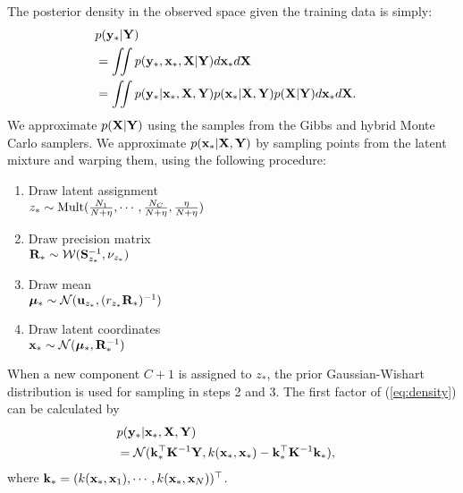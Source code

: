 The posterior density in the observed space given the training data is simply:
\begin{align}
\lefteqn{p(\vy_{*}|\vY)}\nonumber \\
&=\int \!\!\! \int p(\vy_{*},\vx_{*},\vX|\vY)d\vx_{*}d\vX \nonumber\\
&=\int\!\!\! \int p(\vy_{*}|\vx_{*},\vX,\vY)p(\vx_{*}|\vX,\vY)p(\vX|\vY)d\vx_{*}d\vX.
\label{eq:density}
\end{align}
We approximate $p(\mathbf{X}|\mathbf{Y})$ using the samples from the Gibbs and hybrid Monte Carlo samplers.
We approximate $p({\bf{x}}_{*}|\mathbf{X},\mathbf{Y})$ by sampling points from the latent mixture and warping them, using the following procedure:
\begin{enumerate}
\item Draw latent assignment\\
$z_{*} \sim {\rm Mult}(\frac{N_{1}}{N+\eta},\cdots,\frac{N_{C}}{N+\eta},\frac{\eta}{N+\eta})$
\item Draw precision matrix\\
$\mathbf{R}_{*} \sim {\cal W}(\mathbf{S}^{-1}_{z_{*}},\nu_{z_{*}})$
\item Draw mean\\
$\bm{\mu}_{*} \sim {\cal N}({\bf{u}}_{z_{*}},(r_{z_{*}}\mathbf{R}_{*})^{-1})$
\item Draw latent coordinates\\
${\bf{x}}_{*} \sim {\cal N}(\bm{\mu}_{*},\mathbf{R}_{*}^{-1})$
\end{enumerate}
When a new component $C+1$ is assigned to $z_{*}$, 
the prior Gaussian-Wishart distribution is used for sampling in steps 2 and 3.
The first factor of (\ref{eq:density}) can be calculated by
\begin{align}
\lefteqn{p(\vy_{*}|\vx_{*},\vX,\vY)}\nonumber\\
&= {\cal N}(\vk_{*}^{\top}\vK^{-1}\vY,k(\vx_{*},\vx_{*})-\vk_{*}^{\top}\vK^{-1}\vk_{*}),
\end{align}
where
${\bf{k}}_{*}=(k({\bf{x}}_{*},{\bf{x}}_{1}),\cdots,k({\bf{x}}_{*},{\bf{x}}_{N}))^{\top}$.
